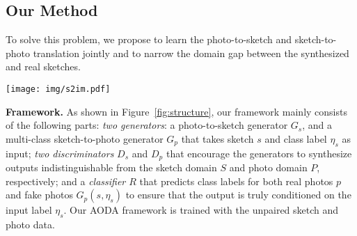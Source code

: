\documentclass[10pt,twocolumn,letterpaper]{article}
\begin{document}
\subsection{Our Method}
\label{sec:method_strategy}
To solve this problem, we propose to learn the photo-to-sketch and sketch-to-photo translation jointly and to narrow the domain gap between the synthesized and real sketches.

\begin{figure*}[tbp]
\centering
    \texttt{[image: img/s2im.pdf]}
\caption{AODA framework overview. It has two generators $G_{s}: \text{photo} \rightarrow \text{sketch} $ and $G_{p}: \text{sketch} \rightarrow \text{photo}$ conditioned on the input label, and two discriminators $D_s$ and $D_p$ for the sketch and photo domains, respectively. In addition, we use a photo classifier $R$ to encourage $G_{p}$ to generate indistinguishable photos from the real ones of the same class.}
    \label{fig:structure}
\end{figure*}

\noindent \textbf{Framework.} As shown in Figure~\ref{fig:structure}, our framework mainly consists of the following parts: \textit{two generators}: a photo-to-sketch generator $G_{s}$, and a multi-class sketch-to-photo generator $G_{p}$ that takes sketch $s$ and class label $\eta_s$ as input; \textit{two discriminators} $D_s$ and $D_p$ that encourage the generators to synthesize outputs indistinguishable from the sketch domain $S$ and photo domain $P$, respectively; and a \textit{classifier $R$} that predicts class labels for both real photos $p$ and fake photos $G_{p}(s,\eta_s)$ to ensure that the output is truly conditioned on the input label $\eta_s$. Our AODA framework is trained with the unpaired sketch and photo data.
\end{document}
